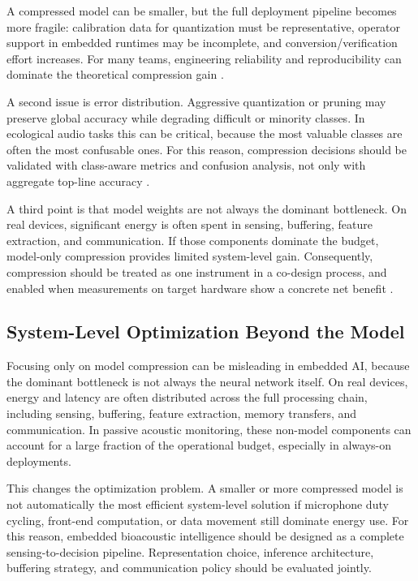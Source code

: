 \documentclass[a4paper,singleside,12pt]{report} %
\begin{document}
    A compressed model can be smaller, but the full deployment pipeline becomes more fragile: calibration data for quantization must be representative, operator support in embedded runtimes may be incomplete, and conversion/verification effort increases. For many teams, engineering reliability and reproducibility can dominate the theoretical compression gain \cite{abadade2023tinymlsurvey,singh2023edgeaisurvey}.

	A second issue is error distribution. Aggressive quantization or pruning may preserve global accuracy while degrading difficult or minority classes. In ecological audio tasks this can be critical, because the most valuable classes are often the most confusable ones. For this reason, compression decisions should be validated with class-aware metrics and confusion analysis, not only with aggregate top-line accuracy \cite{tao2022energy,wuint8quant2020,li2019pruning}.

	A third point is that model weights are not always the dominant bottleneck. On real devices, significant energy is often spent in sensing, buffering, feature extraction, and communication. If those components dominate the budget, model-only compression provides limited system-level gain. Consequently, compression should be treated as one instrument in a co-design process, and enabled when measurements on target hardware show a concrete net benefit \cite{tao2022energy,singh2023edgeaisurvey}.
	
	\subsection{System-Level Optimization Beyond the Model}
Focusing only on model compression can be misleading in embedded AI, because the dominant bottleneck is not always the neural network itself. On real devices, energy and latency are often distributed across the full processing chain, including sensing, buffering, feature extraction, memory transfers, and communication. In passive acoustic monitoring, these non-model components can account for a large fraction of the operational budget, especially in always-on deployments.

This changes the optimization problem. A smaller or more compressed model is not automatically the most efficient system-level solution if microphone duty cycling, front-end computation, or data movement still dominate energy use. For this reason, embedded bioacoustic intelligence should be designed as a complete sensing-to-decision pipeline. Representation choice, inference architecture, buffering strategy, and communication policy should be evaluated jointly.
\end{document}
